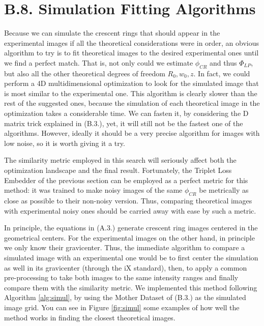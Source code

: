 \documentclass[11pt, a4paper, twoside]{article} %
\begin{document}
\section*{B.8. Simulation Fitting Algorithms}
Because we can simulate the crescent rings that should appear in the experimental images if all the theoretical considerations were in order, an obvious algorithm to try is to fit theoretical images to the desired experimental ones until we find a perfect match. That is, not only could we estimate $\phi_{CR}$ and thus $\Phi_{LP}$, but also all the other theoretical degrees of freedom $R_0,w_0,z$. In fact, we could perform a 4D multidimensional optimization to look for the simulated image that is most similar to the experimental one. This algorithm is clearly slower than the rest of the suggested ones, because the simulation of each theoretical image in the optimization takes a considerable time. We can fasten it, by considering the D matrix trick explained in (B.3.), yet, it will still not be the fastest one of the algorithms. However, ideally it should be a very precise algorithm for images with low noise, so it is worth giving it a try. 

The similarity metric employed in this search will seriously affect both the optimization landscape and the final result. Fortunately, the Triplet Loss Embedder of the previous section can be employed as a perfect metric for this method: it was trained to make noisy images of the same $\phi_{CR}$ be metrically as close as possible to their non-noisy version. Thus, comparing theoretical images with experimental noisy ones should be carried away with ease by such a metric.

In principle, the equations in (A.3.) generate crescent ring images centered in the geometrical centers. For the experimental images on the other hand, in principle we only know their gravicenter. Thus, the immediate algorithm to compare a simulated image with an experimental one would be to first center the simulation as well in its gravicenter (through the iX standard), then, to apply a common pre-processing to take both images to the same intensity ranges and finally compare them with the similarity metric. We implemented this method following Algorithm \ref{alg:simul}, by using the Mother Dataset of (B.3.) as the simulated image grid. You can see in Figure \ref{fig:simul} some examples of how well the method works in finding the closest theoretical images.
\end{document}
